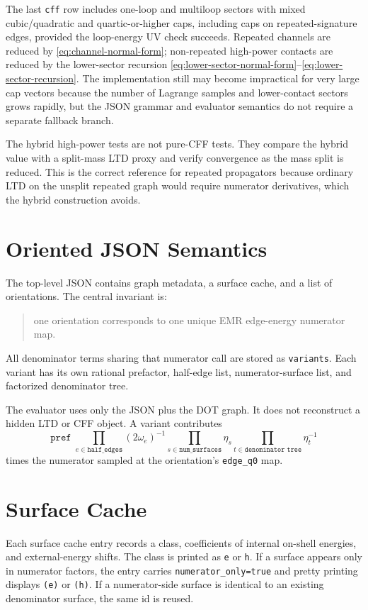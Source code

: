 \documentclass[11pt,a4paper]{report}
\begin{document}
The last \texttt{cff} row includes one-loop and multiloop sectors with mixed
cubic/quadratic and quartic-or-higher caps, including caps on repeated-signature
edges, provided the loop-energy UV check succeeds.  Repeated channels are
reduced by \eqref{eq:channel-normal-form}; non-repeated high-power contacts are
reduced by the lower-sector recursion
\eqref{eq:lower-sector-normal-form}--\eqref{eq:lower-sector-recursion}.  The
implementation still may become impractical for very large cap vectors because
the number of Lagrange samples and lower-contact sectors grows rapidly, but the
JSON grammar and evaluator semantics do not require a separate fallback branch.

The hybrid high-power tests are not pure-CFF tests.  They compare the hybrid
value with a split-mass LTD proxy and verify convergence as the mass split is
reduced.  This is the correct reference for repeated propagators because
ordinary LTD on the unsplit repeated graph would require numerator
derivatives, which the hybrid construction avoids.

\section{Oriented JSON Semantics}

The top-level JSON contains graph metadata, a surface cache, and a list of
orientations.  The central invariant is:
\begin{quote}
one orientation corresponds to one unique EMR edge-energy numerator map.
\end{quote}
All denominator terms sharing that numerator call are stored as
\texttt{variants}.  Each variant has its own rational prefactor, half-edge
list, numerator-surface list, and factorized denominator tree.

The evaluator uses only the JSON plus the DOT graph.  It does not reconstruct a
hidden LTD or CFF object.  A variant contributes
\[
  \texttt{pref}\;
  \prod_{e\in\texttt{half\_edges}}(2\omega_e)^{-1}
  \prod_{s\in\texttt{num\_surfaces}}\eta_s
  \prod_{t\in\texttt{denominator tree}}\eta_t^{-1}
\]
times the numerator sampled at the orientation's \texttt{edge\_q0} map.

\section{Surface Cache}

Each surface cache entry records a class, coefficients of internal on-shell
energies, and external-energy shifts.  The class is printed as
\texttt{e} or \texttt{h}.  If a surface appears only in numerator factors, the
entry carries \texttt{numerator\_only=true} and pretty printing displays
\texttt{(e)} or \texttt{(h)}.  If a numerator-side surface is identical to an
existing denominator surface, the same id is reused.
\end{document}
